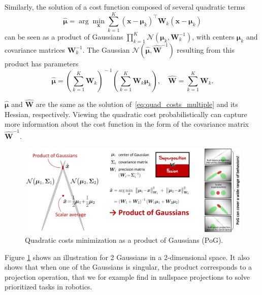 \documentclass[10pt,a4paper]{article} %
\newcommand{\trsp}{{\scriptscriptstyle\top}}
\begin{document}
Similarly, the solution of a cost function composed of several quadratic terms 
\begin{equation}
	\bm{\hat{\mu}} = \arg\min_{\bm{x}} \sum_{k=1}^K {(\bm{x} - \bm{\mu}_k)}^\trsp \bm{W}_k (\bm{x} - \bm{\mu}_k)
\label{eq:quad_costs_multiple}
\end{equation}
can be seen as a product of Gaussians $\prod_{k=1}^K\mathcal{N}(\bm{\mu}_k,\bm{W}_k^{-1})$, with centers $\bm{\mu}_k$ and covariance matrices $\bm{W}_k^{-1}$. The Gaussian $\mathcal{N}(\bm{\hat{\mu}},\bm{\hat{W}}^{-1})$ resulting from this product has parameters
\begin{equation*}
	\bm{\hat{\mu}} = {\left(\sum_{k=1}^K \bm{W}_k\right)}^{\!-1} \left(\sum_{k=1}^K\bm{W}_k \bm{\mu}_k \right), \quad 
	\bm{\hat{W}} = \sum_{k=1}^K \bm{W}_k.
\end{equation*}

$\bm{\hat{\mu}}$ and $\bm{\hat{W}}$ are the same as the solution of~\eqref{eq:quad_costs_multiple} and its Hessian, respectively. Viewing the quadratic cost probabilistically can capture more information about the cost function in the form of the covariance matrix $\bm{\hat{W}}^{-1}$. 

\begin{figure}
\centering
\includegraphics[width=.8\columnwidth]{images/PoG01.png}
\caption{\footnotesize
Quadratic costs minimization as a product of Gaussians (PoG).
}
\label{fig:PoG}
\end{figure}

Figure \ref{fig:PoG} shows an illustration for 2 Gaussians in a 2-dimensional space. It also shows that when one of the Gaussians is singular, the product corresponds to a projection operation, that we for example find in nullspace projections to solve prioritized tasks in robotics. 
\end{document}
